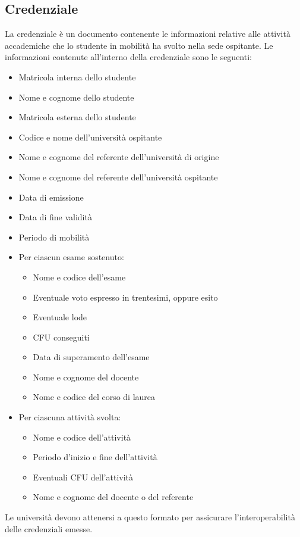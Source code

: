 \documentclass[a4paper,12pt]{article}
\begin{document}
\subsection{Credenziale}
La credenziale è un documento contenente le informazioni relative alle attività accademiche che lo studente in mobilità ha svolto nella sede ospitante. 
\newline Le informazioni contenute all'interno della credenziale sono le seguenti:
\begin{itemize}
    \item Matricola interna dello studente
    \item Nome e cognome dello studente
    \item Matricola esterna dello studente
    \item Codice e nome dell'università ospitante
    \item Nome e cognome del referente dell'università di origine
    \item Nome e cognome del referente dell'università ospitante
    \item Data di emissione  
    \item Data di fine validità
    \item Periodo di mobilità
    \item Per ciascun esame sostenuto:
    \begin{itemize}[label=$\circ$]
        \item Nome e codice dell'esame
        \item Eventuale voto espresso in trentesimi, oppure esito
        \item Eventuale lode
        \item CFU conseguiti
        \item Data di superamento dell'esame
        \item Nome e cognome del docente
        \item Nome e codice del corso di laurea
    \end{itemize}
    \item Per ciascuna attività svolta:
    \begin{itemize}[label=$\circ$]
        \item Nome e codice dell'attività
        \item Periodo d'inizio e fine dell'attività
        \item Eventuali CFU dell'attività
        \item Nome e cognome del docente o del referente
    \end{itemize}
\end{itemize}
Le università devono attenersi a questo formato per assicurare l'interoperabilità delle credenziali emesse.
\end{document}
